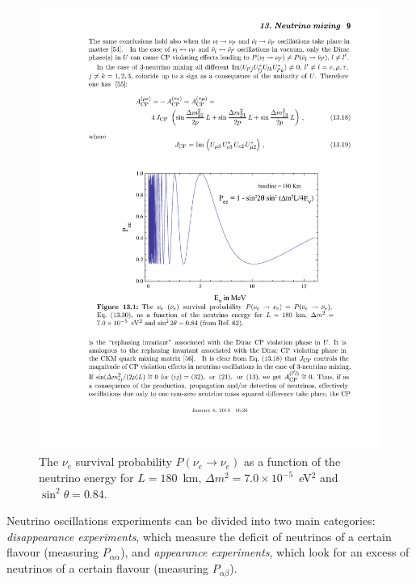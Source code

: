 \begin{figure}
    \centering
    \includegraphics[width=0.7\linewidth]{figures/oscillation.pdf}
    \caption{The $\nu_e$ survival probability $P(\nu_e\rightarrow\nu_e)$ as a function of the neutrino energy for $L=180$~km, $\Delta m^2 = 7.0 \times 10^{-5}$~eV$^2$ and $\sin^2\theta = 0.84$.}
    \label{fig:oscillation}
\end{figure}

Neutrino oscillations experiments can be divided into two main categories: \emph{disappearance experiments}, which measure the deficit of neutrinos of a certain flavour (measuring $P_{\alpha\alpha}$), and \emph{appearance experiments}, which look for an excess of neutrinos of a certain flavour (measuring $P_{\alpha\beta}$).

